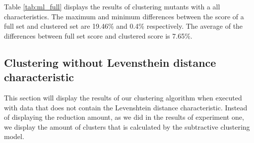 \documentclass[../../main]{subfiles}
\begin{document}
\FloatBarrier
Table \ref{tab:ml_full} displays the results of clustering mutants with a all characteristics.
The maximum and minimum differences between the score of a full set and clustered set are 19.46\% and 0.4\% respectively.
The average of the differences between full set score and clustered score is 7.65\%.
\newpage
\subsection{Clustering without Levensthein distance characteristic}
This section will display the results of our clustering algorithm when executed with data that does not contain the Levenshtein distance characteristic. 
Instead of displaying the reduction amount, as we did in the results of experiment one, we display the amount of clusters that is calculated by the subtractive clustering model.
\end{document}
